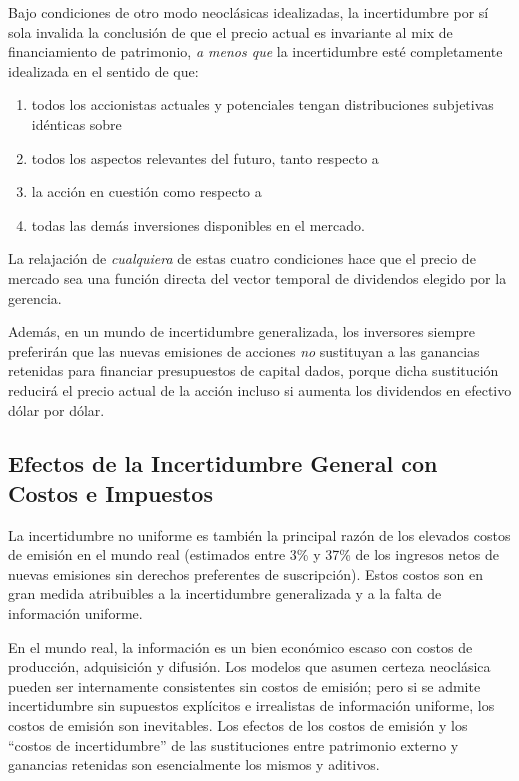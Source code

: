 \documentclass[12pt]{article}
\begin{document}
Bajo condiciones de otro modo neocl\'asicas idealizadas, la incertidumbre por s\'i sola invalida la conclusi\'on de que el precio actual es invariante al mix de financiamiento de patrimonio, \textit{a menos que} la incertidumbre est\'e completamente idealizada en el sentido de que:
\begin{enumerate}
  \item todos los accionistas actuales y potenciales tengan distribuciones subjetivas id\'enticas sobre
  \item todos los aspectos relevantes del futuro, tanto respecto a
  \item la acci\'on en cuesti\'on como respecto a
  \item todas las dem\'as inversiones disponibles en el mercado.
\end{enumerate}

La relajaci\'on de \textit{cualquiera} de estas cuatro condiciones hace que el precio de mercado sea una funci\'on directa del vector temporal de dividendos elegido por la gerencia.

Adem\'as, en un mundo de incertidumbre generalizada, los inversores siempre preferir\'an que las nuevas emisiones de acciones \textit{no} sustituyan a las ganancias retenidas para financiar presupuestos de capital dados, porque dicha sustituci\'on reducir\'a el precio actual de la acci\'on incluso si aumenta los dividendos en efectivo d\'olar por d\'olar.

\subsection{Efectos de la Incertidumbre General con Costos e Impuestos}

La incertidumbre no uniforme es tambi\'en la principal raz\'on de los elevados costos de emisi\'on en el mundo real (estimados entre 3\% y 37\% de los ingresos netos de nuevas emisiones sin derechos preferentes de suscripci\'on). Estos costos son en gran medida atribuibles a la incertidumbre generalizada y a la falta de informaci\'on uniforme.

\begin{intuicion}
En el mundo real, la informaci\'on es un bien econ\'omico escaso con costos de producci\'on, adquisici\'on y difusi\'on. Los modelos que asumen certeza neocl\'asica pueden ser internamente consistentes sin costos de emisi\'on; pero si se admite incertidumbre sin supuestos expl\'icitos e irrealistas de informaci\'on uniforme, los costos de emisi\'on son inevitables. Los efectos de los costos de emisi\'on y los ``costos de incertidumbre'' de las sustituciones entre patrimonio externo y ganancias retenidas son esencialmente los mismos y aditivos.
\end{intuicion}
\end{document}
